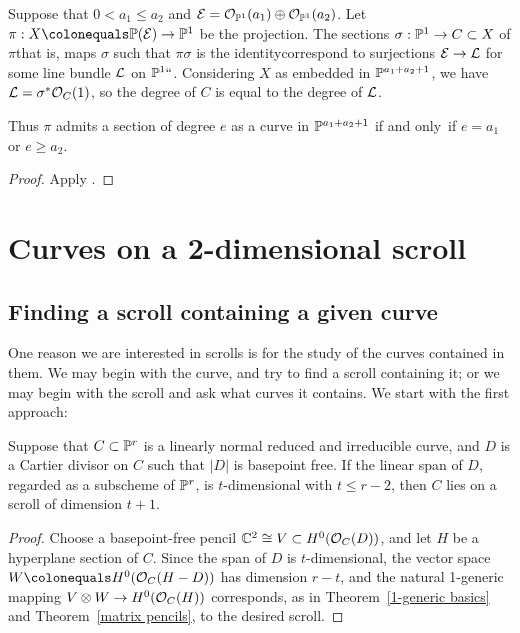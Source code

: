 \begin{proposition} Suppose that $0<a_1\leq a_2$ and
${\mathcal E} = {\mathcal O}_{{\mathbb P}^1}(a_1)\oplus {\mathcal O}_{{\mathbb P}^1}(a_2)$. Let $\pi: X\colonequals
\PP(\sE) \to \PP^1$ be the projection.
The sections $\sigma:{\mathbb P}^1 \to C\subset X$ of $\pi$\emdash that is,
maps $\sigma$ such that $\pi\sigma$ is the
identity\emdash correspond to surjections
${\mathcal E} \to {\mathcal L}$ for some line bundle ${\mathcal L}$ on ${\mathbb P}^1` `$. Considering  $X$
as embedded in
${\mathbb P}^{a_1+a_2+1}$, we have ${\mathcal L} = \sigma^*{\mathcal O}_C(1)$, so the degree of $C$
is equal
to the degree of ${\mathcal L}$.

Thus $\pi$ admits a section of degree $e$ as a curve in ${\mathbb P}^{a_1+a_2+1}$
if and only~if
$e = a_1$ or $e\geq a_2$.
\unif
\end{proposition}

\begin{proof}
Apply \cite[II.7.12]{Hartshorne1977}.
\end{proof}

\section{Curves on a 2-dimensional scroll}\label{curves on scrolls}

\subsection*{Finding a scroll containing a given curve}
One
reason we are interested in scrolls is for the study of the curves
contained in them.
We may begin with the curve, and try to 
find a scroll containing it;
or we may begin with the scroll and ask
what curves it contains. 
We start with the first approach:

\begin{proposition}
Suppose that $C\subset {\mathbb P}^r$ is a linearly normal reduced and irreducible
curve, and $D$ is a  
Cartier divisor
%
on $C$ such that $|D|$ is basepoint
%
free. If the linear span of $D$, regarded as a subscheme of ${\mathbb P}^{r}$,
is $t$-dimensional with $t\leq r-2$, then $C$ lies on a scroll of
dimension $t+1$.
\unif
\end{proposition}

\begin{proof}
Choose a
basepoint-free pencil
%
${\mathbb C}^2\cong V \subset H^0({\mathcal O}_C(D))$,
and let $H$ be a hyperplane section of $C$. Since the span of $D$ is
$t$-dimensional, 
the vector space
$W\colonequals H^0(\sO_C(H-D))$ has dimension $r-t$,
and the natural 1-generic mapping
$V\otimes W \to H^0({\mathcal O}_C(H))$ corresponds, as in Theorem~\ref{1-generic
basics} and Theorem~\ref{matrix pencils}, to the desired scroll.
\end{proof}

